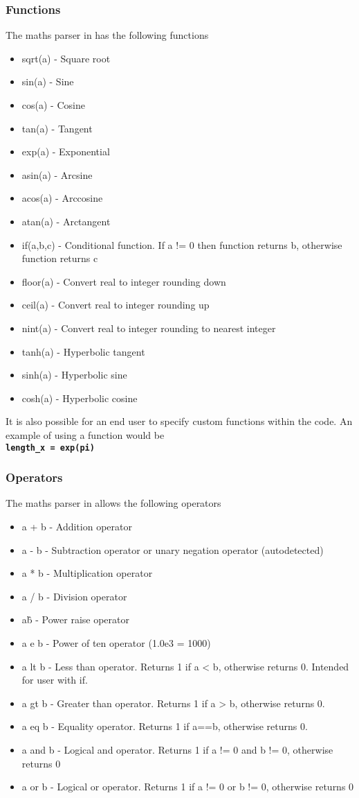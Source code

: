 \documentclass[12pt,a4paper]{article}
\newcommand{\inlinecode}[1]{{\color{warwickred} \bf\texttt{#1}}}
\newcommand{\EPOCH}{{\color{warwickdark}\fontfamily{phv}\selectfont{EPOCH}}}
\begin{document}
\subsubsection{Functions}
The maths parser in {\EPOCH} has the following functions
\begin{itemize}
\item sqrt(a) - Square root
\item sin(a) - Sine
\item cos(a) - Cosine
\item tan(a) - Tangent
\item exp(a) - Exponential
\item asin(a) - Arcsine
\item acos(a) - Arccosine
\item atan(a) - Arctangent
\item if(a,b,c) - Conditional function. If a != 0 then function returns b,
  otherwise function returns c
\item floor(a) - Convert real to integer rounding down
\item ceil(a) - Convert real to integer rounding up
\item nint(a) - Convert real to integer rounding to nearest integer
\item tanh(a) - Hyperbolic tangent
\item sinh(a) - Hyperbolic sine
\item cosh(a) - Hyperbolic cosine
\end{itemize}

It is also possible for an end user to specify custom functions within the
code. An example of using a function would be\\
\inlinecode{length\_x = exp(pi)}\\

\subsubsection{Operators}
The maths parser in {\EPOCH} allows the following operators
\begin{itemize}
\item a + b - Addition operator
\item a - b - Subtraction operator or unary negation operator (autodetected)
\item a * b - Multiplication operator
\item a / b - Division operator
\item a\^b - Power raise operator
\item a e b - Power of ten operator (1.0e3 = 1000)
\item a lt b - Less than operator. Returns 1 if a < b, otherwise returns
  0. Intended for user with if.
\item a gt b - Greater than operator. Returns 1 if a > b, otherwise returns 0.
\item a eq b - Equality operator. Returns 1 if a==b, otherwise returns 0.
\item a and b - Logical and operator. Returns 1 if a != 0 and b != 0,
  otherwise returns 0
\item a or b - Logical or operator. Returns 1 if a != 0 or b != 0, otherwise
  returns 0
\end{itemize}
\end{document}
